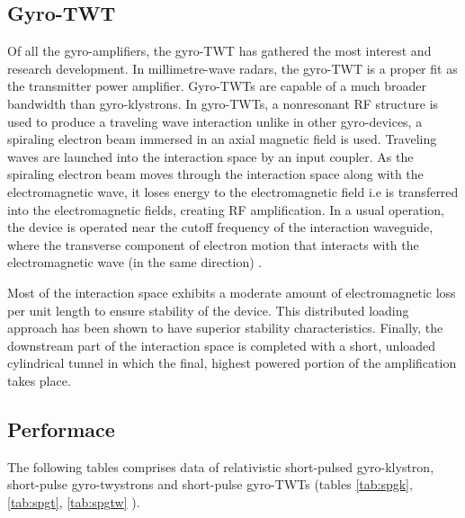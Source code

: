 \subsection{Gyro-TWT}\cite{ref:pkmm}
Of all the gyro-amplifiers, the gyro-TWT has gathered the most interest and research development. In millimetre-wave radars, the gyro-TWT is a proper fit as the transmitter power amplifier. Gyro-TWTs are capable of a much broader bandwidth than gyro-klystrons.
In gyro-TWTs, a nonresonant RF structure is used to produce a traveling wave interaction unlike in other gyro-devices, a spiraling electron beam immersed in an axial magnetic field is used. Traveling waves are launched into the interaction space by an input coupler. As the spiraling electron beam moves through the interaction space along with the electromagnetic wave, it loses energy to the electromagnetic field i.e is transferred into the electromagnetic fields, creating RF amplification. In a usual operation, the device is operated near the cutoff frequency of the interaction waveguide, where the transverse component of electron motion that interacts with the electromagnetic wave (in the same direction) .

Most of the interaction space exhibits a moderate amount of electromagnetic loss per unit length to ensure stability of the device. This distributed loading approach has been shown to have superior stability characteristics. Finally, the downstream part of the interaction space is completed with a short, unloaded cylindrical tunnel in which the final, highest powered portion of the amplification takes place.

\subsection{Performace}
The following tables comprises data of relativistic short-pulsed gyro-klystron,  short-pulse gyro-twystrons and short-pulse gyro-TWTs (tables \ref{tab:spgk}, \ref{tab:spgt}, \ref{tab:spgtw} ).

\begin{table}[H]
	\caption{Relativistic Short-Pulse Gyro-Klystrons\cite{ref:soa} }
	\label{tab:spgk}
\end{table}

